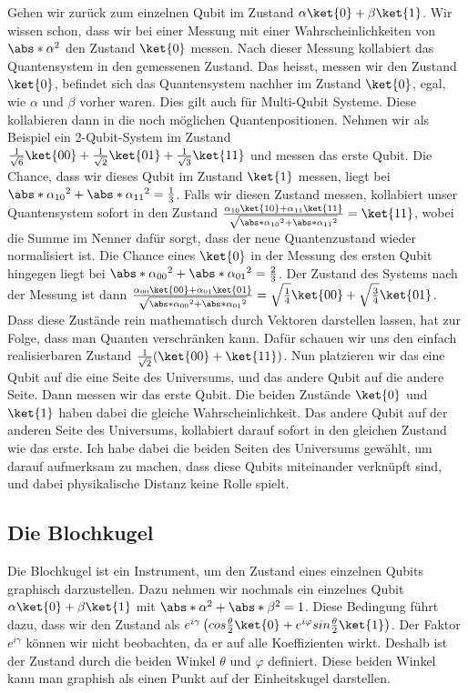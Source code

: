 Gehen wir zurück zum einzelnen Qubit im Zustand $\alpha\ket{0} + \beta\ket{1}$. Wir wissen schon, dass wir bei einer Messung mit einer Wahrscheinlichkeiten von $\abs*{\alpha}^2$ den Zustand $\ket{0}$ messen. Nach dieser Messung kollabiert das Quantensystem in den gemessenen Zustand. Das heisst, messen wir den Zustand $\ket{0}$, befindet sich das Quantensystem nachher im Zustand $\ket{0}$, egal, wie $\alpha$ und $\beta$ vorher waren. Dies gilt auch für Multi-Qubit Systeme. Diese kollabieren dann in die noch möglichen Quantenpositionen. Nehmen wir als Beispiel ein 2-Qubit-System im Zustand $\frac{1}{\sqrt{6}}\ket{00} + \frac{1}{\sqrt{2}}\ket{01} + \frac{1}{\sqrt{3}}\ket{11}$ und messen das erste Qubit. Die Chance, dass wir dieses Qubit im Zustand $\ket{1}$ messen, liegt bei $\abs*{\alpha_{10}}^2 + \abs*{\alpha_{11}}^2 = \frac{1}{3}$. Falls wir diesen Zustand messen, kollabiert unser Quantensystem sofort in den Zustand $\frac{\alpha_{10}\ket{10} + \alpha_{11}\ket{11}}{\sqrt{\abs*{\alpha_{10}}^2 + \abs*{\alpha_{11}}^2}} = \ket{11}$, wobei die Summe im Nenner dafür sorgt, dass der neue Quantenzustand wieder normalisiert ist. Die Chance eines $\ket{0}$ in der Messung des ersten Qubit hingegen liegt bei $\abs*{\alpha_{00}}^2 + \abs*{\alpha_{01}}^2 = \frac{2}{3}$. Der Zustand des Systems nach der Messung ist dann $\frac{\alpha_{00}\ket{00} + \alpha_{01}\ket{01}}{\sqrt{\abs*{\alpha_{00}}^2 + \abs*{\alpha_{01}}^2}} = \sqrt{\frac{1}{4}}\ket{00} + \sqrt{\frac{3}{4}}\ket{01}$.
Dass diese Zustände rein mathematisch durch Vektoren darstellen lassen, hat zur Folge, dass man Quanten verschränken kann. Dafür schauen wir uns den einfach realisierbaren Zustand $\frac{1}{\sqrt{2}}(\ket{00} + \ket{11})$. Nun platzieren wir das eine Qubit auf die eine Seite des Universums, und das andere Qubit auf die andere Seite. Dann messen wir das erste Qubit. Die beiden Zustände $\ket{0}$ und $\ket{1}$ haben dabei die gleiche Wahrscheinlichkeit. Das andere Qubit auf der anderen Seite des Universums, kollabiert darauf sofort in den gleichen Zustand wie das erste. Ich habe dabei die beiden Seiten des Universums gewählt, um darauf aufmerksam zu machen, dass diese Qubits miteinander verknüpft sind, und dabei physikalische Distanz keine Rolle spielt.

\subsection{Die Blochkugel}
Die Blochkugel ist ein Instrument, um den Zustand eines einzelnen Qubits graphisch darzustellen. Dazu nehmen wir nochmals ein einzelnes Qubit $\alpha\ket{0} + \beta\ket{1}$ mit $\abs*{\alpha}^2 + \abs*{\beta}^2 = 1$. Diese Bedingung führt dazu, dass wir den Zustand als $e^{i\gamma}\left(cos\frac{\theta}{2}\ket{0} + e^{i\varphi}sin\frac{\theta}{2}\ket{1}\right)$. Der Faktor $e^{i\gamma}$ können wir nicht beobachten, da er auf alle Koeffizienten wirkt. Deshalb ist der Zustand durch die beiden Winkel $\theta$ und $\varphi$ definiert. Diese beiden Winkel kann man graphish als einen Punkt auf der Einheitskugel darstellen.

